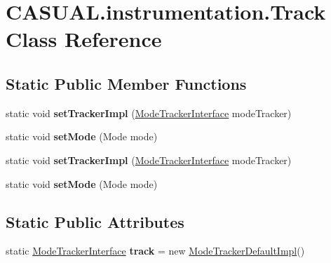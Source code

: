 \hypertarget{class_c_a_s_u_a_l_1_1instrumentation_1_1_track}{\section{C\-A\-S\-U\-A\-L.\-instrumentation.\-Track Class Reference}
\label{class_c_a_s_u_a_l_1_1instrumentation_1_1_track}
}
\subsection*{Static Public Member Functions}
\begin{DoxyCompactItemize}
\item 
\hypertarget{class_c_a_s_u_a_l_1_1instrumentation_1_1_track_aaef7a1f7abdda0c1fb845502832f16f4}{static void {\bfseries set\-Tracker\-Impl} (\hyperlink{interface_c_a_s_u_a_l_1_1instrumentation_1_1_mode_tracker_interface}{Mode\-Tracker\-Interface} mode\-Tracker)}\label{class_c_a_s_u_a_l_1_1instrumentation_1_1_track_aaef7a1f7abdda0c1fb845502832f16f4}

\item 
\hypertarget{class_c_a_s_u_a_l_1_1instrumentation_1_1_track_afd9cfe9bcf966a2db4b040fe3ce3b171}{static void {\bfseries set\-Mode} (Mode mode)}\label{class_c_a_s_u_a_l_1_1instrumentation_1_1_track_afd9cfe9bcf966a2db4b040fe3ce3b171}

\item 
\hypertarget{class_c_a_s_u_a_l_1_1instrumentation_1_1_track_aaef7a1f7abdda0c1fb845502832f16f4}{static void {\bfseries set\-Tracker\-Impl} (\hyperlink{interface_c_a_s_u_a_l_1_1instrumentation_1_1_mode_tracker_interface}{Mode\-Tracker\-Interface} mode\-Tracker)}\label{class_c_a_s_u_a_l_1_1instrumentation_1_1_track_aaef7a1f7abdda0c1fb845502832f16f4}

\item 
\hypertarget{class_c_a_s_u_a_l_1_1instrumentation_1_1_track_afd9cfe9bcf966a2db4b040fe3ce3b171}{static void {\bfseries set\-Mode} (Mode mode)}\label{class_c_a_s_u_a_l_1_1instrumentation_1_1_track_afd9cfe9bcf966a2db4b040fe3ce3b171}

\end{DoxyCompactItemize}
\subsection*{Static Public Attributes}
\begin{DoxyCompactItemize}
\item 
\hypertarget{class_c_a_s_u_a_l_1_1instrumentation_1_1_track_a6bfb306151889c0b094d903207a9991a}{static \hyperlink{interface_c_a_s_u_a_l_1_1instrumentation_1_1_mode_tracker_interface}{Mode\-Tracker\-Interface} {\bfseries track} = new \hyperlink{class_c_a_s_u_a_l_1_1instrumentation_1_1_mode_tracker_default_impl}{Mode\-Tracker\-Default\-Impl}()}\label{class_c_a_s_u_a_l_1_1instrumentation_1_1_track_a6bfb306151889c0b094d903207a9991a}

\end{DoxyCompactItemize}


